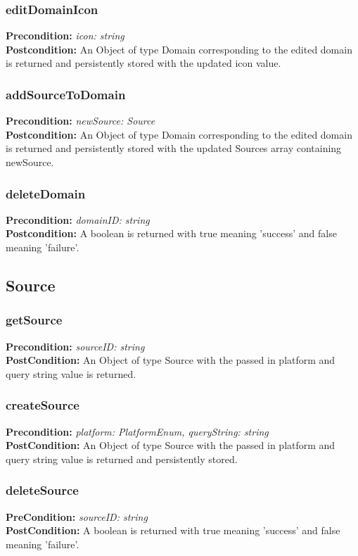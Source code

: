 \documentclass[12pt]{article}
\begin{document}
\subsubsection*{editDomainIcon}
\textbf{Precondition:} \textit{icon: string} \\
\textbf{Postcondition:} An Object of type Domain corresponding to the edited domain is returned and persistently stored with the updated icon value.

\subsubsection*{addSourceToDomain}
\textbf{Precondition:} \textit{newSource: Source} \\
\textbf{Postcondition:} An Object of type Domain corresponding to the edited domain is returned and persistently stored with the updated Sources array containing newSource.

\subsubsection*{deleteDomain}
\textbf{Precondition:} \textit{domainID: string} \\
\textbf{Postcondition:} A boolean is returned with true meaning 'success' and false meaning 'failure'.

\subsection{Source}

\subsubsection*{getSource}
\textbf{Precondition:} \textit{sourceID: string} \\
\textbf{PostCondition:} An Object of type Source with the passed in platform and query string value is returned.

\subsubsection*{createSource}
\textbf{Precondition:} \textit{platform: PlatformEnum, queryString: string} \\
\textbf{PostCondition:} An Object of type Source with the passed in platform and query string value is returned and persistently stored.

\subsubsection*{deleteSource}
\textbf{PreCondition:} \textit{sourceID: string} \\
\textbf{PostCondition:} A boolean is returned with true meaning 'success' and false meaning 'failure'.
\end{document}
